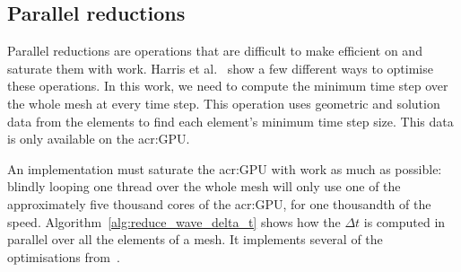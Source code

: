 \subsection{Parallel reductions}\label{subsection:graphics_processing_units:implementation:reductions}

Parallel reductions are operations that are difficult to make efficient on  and
saturate them with work. Harris et al.~\cite{Harris2007} show a few different ways to optimise these
operations. In this work, we need to compute the minimum time step over the whole mesh at every time
step. This operation uses geometric and solution data from the elements to find each element's
minimum time step size. This data is only available on the \acrshort{acr:GPU}. 

An implementation must saturate the \acrshort{acr:GPU} with work as much as possible: blindly
looping one thread over the whole mesh will only use one of the approximately five thousand cores of
the \acrshort{acr:GPU}, for one thousandth of the speed. Algorithm~\ref{alg:reduce_wave_delta_t}
shows how the \(\Delta t\) is computed in parallel over all the elements of a mesh. It implements
several of the optimisations from~\cite{Harris2007}.

